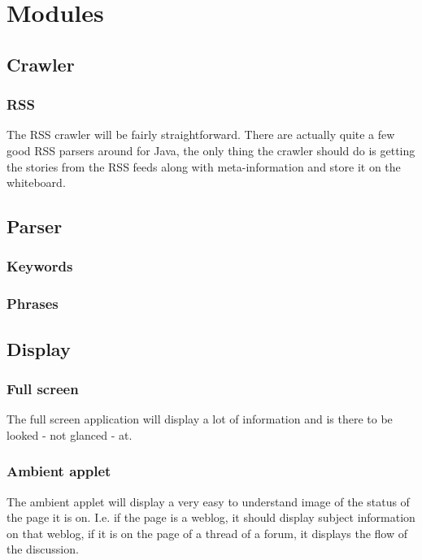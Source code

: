\section{Modules}


\subsection{Crawler}

\subsubsection{RSS}

The RSS crawler will be fairly straightforward. There are actually quite a few
good RSS parsers around for Java, the only thing the crawler should do is
getting the stories from the RSS feeds along with meta-information and store it
on the whiteboard.

\subsection{Parser}

\subsubsection{Keywords}

\subsubsection{Phrases}


\subsection{Display}

\subsubsection{Full screen}

The full screen application will display a lot of information and is there to
be looked - not glanced - at.

\subsubsection{Ambient applet}

The ambient applet will display a very easy to understand image of the status
of the page it is on. I.e. if the page is a weblog, it should display subject
information on that weblog, if it is on the page of a thread of a forum, it
displays the flow of the discussion.
